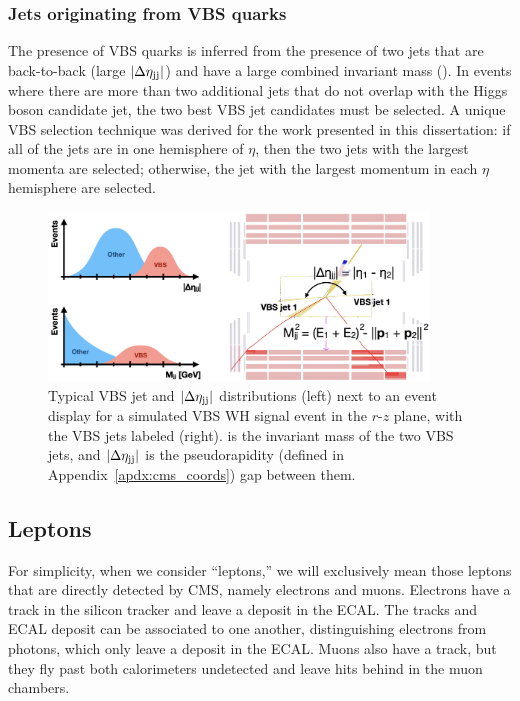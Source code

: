 \subsubsection{Jets originating from VBS quarks}\label{sec:vbsjets}
The presence of VBS quarks is inferred from the presence of two jets that are back-to-back (large $\lvert \Delta\eta_{\mathrm{j}\mathrm{j}} \rvert$) and have a large combined invariant mass (\Mjj). 
In events where there are more than two additional jets that do not overlap with the Higgs boson candidate jet, the two best VBS jet candidates must be selected. 
A unique VBS selection technique was derived for the work presented in this dissertation: 
if all of the jets are in one hemisphere of $\eta$, then the two jets with the largest momenta are selected; 
otherwise, the jet with the largest momentum in each $\eta$ hemisphere are selected.

\begin{figure}[htb]
    \centering
    \includegraphics[width=0.9\textwidth]{fig/vbs_signature.png}
    \caption[VBS jets signature.]{
        Typical VBS jet \Mjj and $\lvert \Delta\eta_{\mathrm{j}\mathrm{j}} \rvert$ distributions (left) next to an event display for a simulated VBS WH signal event in the $r$-$z$ plane, with the VBS jets labeled (right). 
        \Mjj is the invariant mass of the two VBS jets, and $\lvert \Delta\eta_{\mathrm{j}\mathrm{j}} \rvert$ is the pseudorapidity (defined in Appendix~\ref{apdx:cms_coords}) gap between them. 
    }
    \label{fig:vbs_fireworks}
\end{figure}

\subsection{Leptons}
For simplicity, when we consider ``leptons,'' we will exclusively mean those leptons that are directly detected by CMS, namely electrons and muons. 
Electrons have a track in the silicon tracker and leave a deposit in the ECAL. 
The tracks and ECAL deposit can be associated to one another, distinguishing electrons from photons, which only leave a deposit in the ECAL. 
Muons also have a track, but they fly past both calorimeters undetected and leave hits behind in the muon chambers. 

